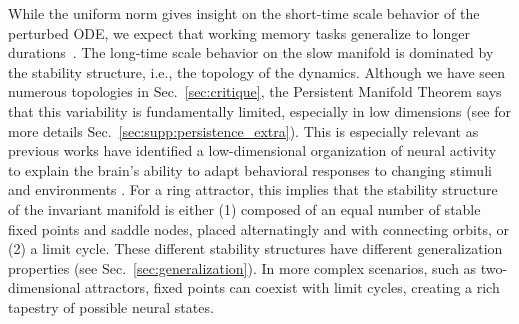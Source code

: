 \documentclass{article} %
\newcommand{\mpcomment}[1]{\textcolor{mpcolor}{(#1)}}
\newcommand{\pscomment}[1]{\textcolor{BurntOrange}{(#1)}}
\newcounter{ct}
\theoremstyle{definition}
\theoremstyle{remark}
\begin{document}
While the uniform norm gives insight on the short-time scale behavior of the perturbed ODE, we expect that working memory tasks generalize to longer durations~\citep{Park2023a}.
The long-time scale behavior on the slow manifold is dominated by the stability structure, i.e., the topology of the dynamics.
Although we have seen numerous topologies in Sec.~\ref{sec:critique}, the Persistent Manifold Theorem says that this variability is fundamentally limited, especially in low dimensions (see for more details Sec.~\ref{sec:supp:persistence_extra}).
This is especially relevant as previous works have identified a low-dimensional organization of neural activity to explain the brain's ability to adapt behavioral responses to changing stimuli and environments \citep{beiran2023parametric,altan2023low,fanthomme2021low}.
For a ring attractor, this implies that the stability structure of the invariant manifold is either
(1) composed of an equal number of stable fixed points and saddle nodes, placed alternatingly and with connecting orbits, or (2) a limit cycle.
These different stability structures have different generalization properties (see Sec.~\ref{sec:generalization}).
In more complex scenarios, such as two-dimensional attractors, fixed points can coexist with limit cycles, creating a rich tapestry of possible neural states.

\end{document}
